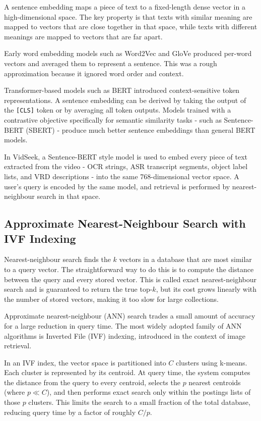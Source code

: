 \documentclass[12pt, a4paper]{report}
\begin{document}
A sentence embedding maps a piece of text to a fixed-length dense vector
in a high-dimensional space. The key property is that texts with similar
meaning are mapped to vectors that are close together in that space, while
texts with different meanings are mapped to vectors that are far apart.

Early word embedding models such as Word2Vec and GloVe produced per-word
vectors and averaged them to represent a sentence. This was a rough approximation
because it ignored word order and context.

Transformer-based models such as BERT introduced context-sensitive token
representations. A sentence embedding can be derived by taking the output
of the \texttt{[CLS]} token or by averaging all token outputs. Models trained
with a contrastive objective specifically for semantic similarity tasks -
such as Sentence-BERT (SBERT) - produce much better sentence embeddings
than general BERT models.

In VidSeek, a Sentence-BERT style model is used to embed every piece of
text extracted from the video - OCR strings, ASR transcript segments, object
label lists, and VRD descriptions - into the same 768-dimensional vector
space. A user's query is encoded by the same model, and retrieval is performed
by nearest-neighbour search in that space.

\subsection{Approximate Nearest-Neighbour Search with IVF Indexing}

Nearest-neighbour search finds the $k$ vectors in a database that are most
similar to a query vector. The straightforward way to do this is to compute
the distance between the query and every stored vector. This is called
exact nearest-neighbour search and is guaranteed to return the true top-$k$,
but its cost grows linearly with the number of stored vectors, making it
too slow for large collections.

Approximate nearest-neighbour (ANN) search trades a small amount of accuracy
for a large reduction in query time. The most widely adopted family of ANN
algorithms is Inverted File (IVF) indexing, introduced in the context of
image retrieval.

In an IVF index, the vector space is partitioned into $C$ clusters using
k-means. Each cluster is represented by its centroid. At query time, the
system computes the distance from the query to every centroid, selects the
$p$ nearest centroids (where $p \ll C$), and then performs exact search
only within the postings lists of those $p$ clusters. This limits the search
to a small fraction of the total database, reducing query time by a factor
of roughly $C/p$.
\end{document}
